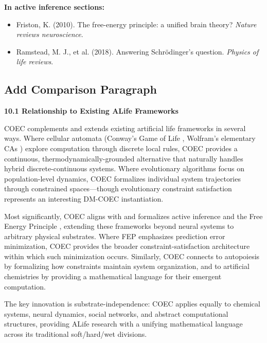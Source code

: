 \documentclass[11pt]{article}
\begin{document}
\textbf{In active inference sections:}
\begin{itemize}
    \item Friston, K. (2010). The free-energy principle: a unified brain theory? \textit{Nature reviews neuroscience}.
    \item Ramstead, M. J., et al. (2018). Answering Schrödinger's question. \textit{Physics of life reviews}.
\end{itemize}

\subsection{Add Comparison Paragraph}

\begin{tcolorbox}[colback=add!10,colframe=add,title=ADD to Section 10 (Discussion)]
\textbf{10.1 Relationship to Existing ALife Frameworks}

COEC complements and extends existing artificial life frameworks in several ways. Where cellular automata (Conway's Game of Life \cite{gardner1970life}, Wolfram's elementary CAs \cite{wolfram2002new}) explore computation through discrete local rules, COEC provides a continuous, thermodynamically-grounded alternative that naturally handles hybrid discrete-continuous systems. Where evolutionary algorithms \cite{holland1992adaptation} focus on population-level dynamics, COEC formalizes individual system trajectories through constrained spaces—though evolutionary constraint satisfaction represents an interesting DM-COEC instantiation.

Most significantly, COEC aligns with and formalizes active inference and the Free Energy Principle \cite{friston2010free}, extending these frameworks beyond neural systems to arbitrary physical substrates. Where FEP emphasizes prediction error minimization, COEC provides the broader constraint-satisfaction architecture within which such minimization occurs. Similarly, COEC connects to autopoiesis \cite{maturana1991autopoiesis} by formalizing how constraints maintain system organization, and to artificial chemistries \cite{dittrich2001artificial} by providing a mathematical language for their emergent computation.

The key innovation is substrate-independence: COEC applies equally to chemical systems, neural dynamics, social networks, and abstract computational structures, providing ALife research with a unifying mathematical language across its traditional soft/hard/wet divisions.
\end{tcolorbox}
\end{document}
